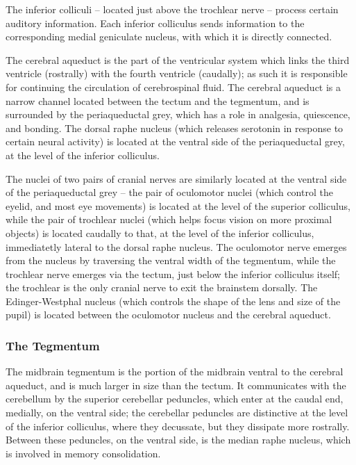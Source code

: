\documentclass[]{book}
\begin{document}
The inferior colliculi -- located just above the trochlear nerve -- process certain auditory information. Each inferior colliculus sends information to the corresponding medial geniculate nucleus, with which it is directly connected.

The cerebral aqueduct is the part of the ventricular system which links the third ventricle (rostrally) with the fourth ventricle (caudally); as such it is responsible for continuing the circulation of cerebrospinal fluid. The cerebral aqueduct is a narrow channel located between the tectum and the tegmentum, and is surrounded by the periaqueductal grey, which has a role in analgesia, quiescence, and bonding. The dorsal raphe nucleus (which releases serotonin in response to certain neural activity) is located at the ventral side of the periaqueductal grey, at the level of the inferior colliculus.

The nuclei of two pairs of cranial nerves are similarly located at the ventral side of the periaqueductal grey -- the pair of oculomotor nuclei (which control the eyelid, and most eye movements) is located at the level of the superior colliculus, while the pair of trochlear nuclei (which helps focus vision on more proximal objects) is located caudally to that, at the level of the inferior colliculus, immediatetly lateral to the dorsal raphe nucleus. The oculomotor nerve emerges from the nucleus by traversing the ventral width of the tegmentum, while the trochlear nerve emerges via the tectum, just below the inferior colliculus itself; the trochlear is the only cranial nerve to exit the brainstem dorsally. The Edinger-Westphal nucleus (which controls the shape of the lens and size of the pupil) is located between the oculomotor nucleus and the cerebral aqueduct.

\hypertarget{the-tegmentum}{%
\subsubsection{The Tegmentum}\label{the-tegmentum}}

The midbrain tegmentum is the portion of the midbrain ventral to the cerebral aqueduct, and is much larger in size than the tectum. It communicates with the cerebellum by the superior cerebellar peduncles, which enter at the caudal end, medially, on the ventral side; the cerebellar peduncles are distinctive at the level of the inferior colliculus, where they decussate, but they dissipate more rostrally. Between these peduncles, on the ventral side, is the median raphe nucleus, which is involved in memory consolidation.
\end{document}
